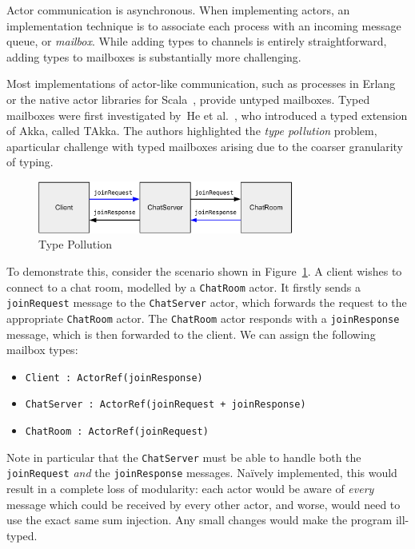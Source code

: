 \documentclass[
graybox,
envcountchap
]{svmult}
\begin{document}
\begin{bibunit}
  Actor communication is asynchronous. When implementing actors, an
  implementation technique is to associate each process with an incoming message
  queue, or \emph{mailbox}. While adding types to channels is entirely
  straightforward, adding types to mailboxes is substantially more challenging.

  Most implementations of actor-like communication, such as processes in
  Erlang~\cite{Armstrong10:erlang} or the native actor libraries for
  Scala~\cite{HallerO09:actors}, provide untyped mailboxes.
  Typed mailboxes were first investigated by~He et al.~\cite{HeWT14:actors}, who
  introduced a typed extension of Akka, called TAkka. The authors highlighted
  the \emph{type pollution} problem, aparticular challenge with typed mailboxes
  arising due to the coarser granularity of typing.

  \begin{figure}
    \centering
    \includegraphics[width=0.75\textwidth]{img/type-pollution-example.pdf}
    \caption{Type Pollution}
    \label{fig:bt:type-pollution}
  \end{figure}

  To demonstrate this,
  consider the scenario shown in Figure~\ref{fig:bt:type-pollution}. A client
  wishes to connect to a chat room, modelled by a \lstinline+ChatRoom+ actor. It
  firstly sends a \lstinline+joinRequest+ message to the \lstinline+ChatServer+
  actor, which forwards the request to the appropriate \lstinline+ChatRoom+
  actor. The \lstinline+ChatRoom+ actor responds with a \lstinline+joinResponse+
  message, which is then forwarded to the client. We can assign the following
  mailbox types:


  \begin{itemize}
    \item \lstinline|Client : ActorRef(joinResponse)|
    \item \lstinline|ChatServer : ActorRef(joinRequest + joinResponse)|
    \item \lstinline|ChatRoom : ActorRef(joinRequest)|
  \end{itemize}

  Note in particular that the \lstinline+ChatServer+ must be able to handle both
  the \lstinline+joinRequest+ \emph{and} the \lstinline+joinResponse+ messages.
  Na\"ively implemented, this would result in a complete loss of modularity:
  each actor would be aware of \emph{every} message which could be received by
  every other actor, and worse, would need to use the exact same sum injection.
  Any small changes would make the program ill-typed.


\end{bibunit}
\end{document}
